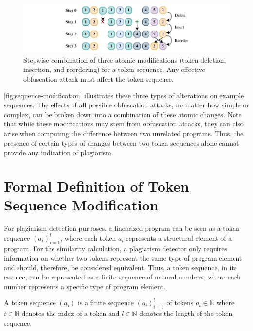 \begin{figure}[hb]
    \centering
    \includegraphics[width=\linewidth]{figures/atomic.pdf}
    \caption[Atomic Changes on Token Sequence Level]{Stepwise combination of three atomic modifications (token deletion, insertion, and reordering) for a token sequence. Any effective obfuscation attack must affect the token sequence.}
    \label{fig:sequence-modification}
\end{figure}

\autoref{fig:sequence-modification} illustrates these three types of alterations on example sequences.
The effects of all possible obfuscation attacks, no matter how simple or complex, can be broken down into a combination of these atomic changes.
Note that while these modifications may stem from obfuscation attacks, they can also arise when computing the difference between two unrelated programs.
Thus, the presence of certain types of changes between two token sequences alone cannot provide any indication of plagiarism.

\section{Formal Definition of Token Sequence Modification}\label{sec:threatmodel-algebra}

For plagiarism detection purposes, a linearized program can be seen as a token sequence \((a_i)_{i=1}^{l}\), where each token \(a_i\) represents a structural element of a program.
For the similarity calculation, a plagiarism detector only requires information on whether two tokens represent the same type of program element and should, therefore, be considered equivalent. 
Thus, a token sequence, in its essence, can be represented as a finite sequence of natural numbers, where each number represents a specific type of program element.

\begin{theorem}
    A token sequence \((a_i)\) is a finite sequence \((a_i)_{i=1}^{l}\) of tokens \( a_i \in \mathbb{N}\) where \(i \in \mathbb{N}\) denotes the index of a token and \(l \in \mathbb{N}\) denotes the length of the token sequence.
\end{theorem}

